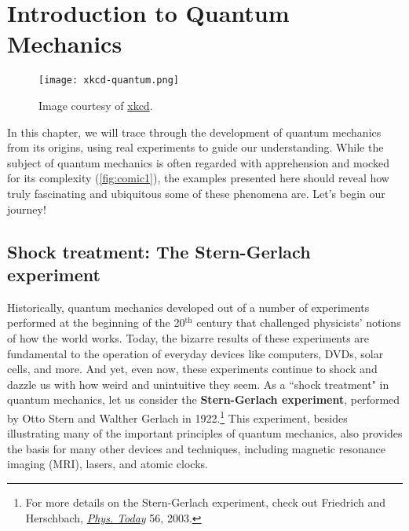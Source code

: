 

%

\chapter[Introduction]{Introduction to Quantum Mechanics} \label{ch:intro}
	
\begin{figure}[!h]
	\centering
	\texttt{[image: xkcd-quantum.png]} \label{fig:xkcd1} 
	\caption{Image courtesy of \href{https://xkcd.com/1240/}{xkcd}.}
	\label{fig:comic1}
\end{figure}

In this chapter, we will trace through the development of quantum mechanics from its origins, using real experiments to guide our understanding. 
While the subject of quantum mechanics is often regarded with apprehension and mocked for its complexity (\autoref{fig:comic1}), the examples presented here should reveal how truly fascinating and ubiquitous some of these phenomena are. 
Let's begin our journey!


\section[Shock treatment]{Shock treatment: The Stern-Gerlach experiment}

Historically, quantum mechanics developed out of a number of experiments performed at the beginning of the 20$^{\text{th}}$ century that challenged physicists' notions of how the world works. 
Today, the bizarre results of these experiments are fundamental to the operation of everyday devices like computers, DVDs, solar cells, and more. 
And yet, even now, these experiments continue to shock and dazzle us with how weird and unintuitive they seem. 
As a ``shock treatment" in quantum mechanics, let us consider the \textbf{Stern-Gerlach experiment}, performed by Otto Stern and Walther Gerlach in 1922.\footnote{For more details on the Stern-Gerlach experiment, check out Friedrich and Herschbach, \href{http://physicstoday.scitation.org/doi/10.1063/1.1650229}{\emph{Phys. Today}} 56, 2003.}
This experiment, besides illustrating many of the important principles of quantum mechanics, also provides the basis for many other devices and techniques, including magnetic resonance imaging (MRI), lasers, and atomic clocks.

